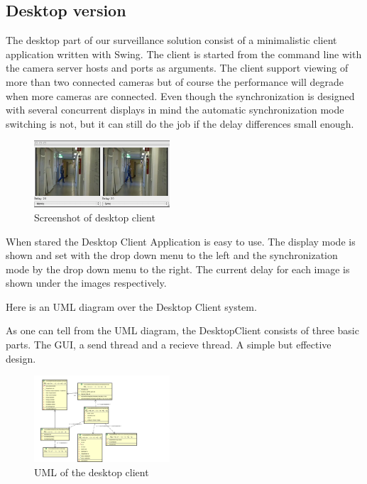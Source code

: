 \documentclass[8pt,titlepage]{article}
\begin{document}
\subsection{Desktop version}
The desktop part of our surveillance solution consist of a minimalistic client application written with Swing. The client is started from the command line with the camera server hosts and ports as arguments. The client support viewing of more than two connected cameras but of course the performance will degrade when more cameras are connected. Even though the synchronization is designed with several concurrent displays in mind the automatic synchronization mode switching is not, but it can still do the job if the delay differences small enough.

\begin{figure}[hbp]
\includegraphics[width=0.45\textwidth]{../screenshots/desktopclient.png}
\caption{Screenshot of desktop client}
\label{desktopclient}
\end{figure}

When stared the Desktop Client Application is easy to use. The display mode is shown and set with the drop down menu to the left and the synchronization mode by the drop down menu to the right. The current delay for each image is shown under the images respectively.

Here is an UML diagram over the Desktop Client system. 

As one can tell from the UML diagram, the DesktopClient consists of three basic parts. The GUI, a send thread and a recieve thread. A simple but effective design.

\begin{figure}[hbp]
\includegraphics[width=0.45\textwidth]{../uml/desktop-client.png}
\caption{UML of the desktop client}
\end{figure}
\end{document}
